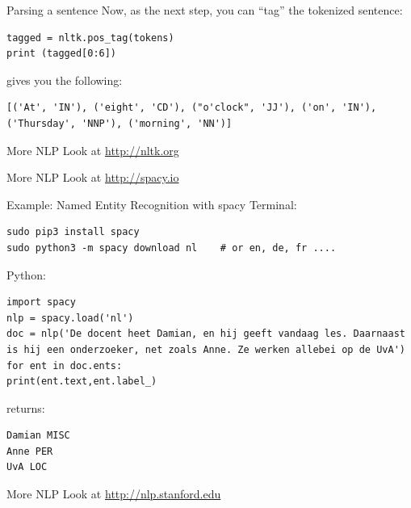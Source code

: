 \documentclass{beamer}
\begin{document}
\begin{frame}[fragile]{Parsing a sentence}
Now, as the next step, you can ``tag'' the tokenized sentence:
\begin{lstlisting}
tagged = nltk.pos_tag(tokens)
print (tagged[0:6])
\end{lstlisting}
gives you the following:
\begin{lstlisting}
[('At', 'IN'), ('eight', 'CD'), ("o'clock", 'JJ'), ('on', 'IN'),
('Thursday', 'NNP'), ('morning', 'NN')]
\end{lstlisting}


\end{frame}


\begin{frame}{More NLP}
\Huge{Look at \url{http://nltk.org}}

\end{frame}


\begin{frame}{More NLP}
\Huge{Look at \url{http://spacy.io}}
\end{frame}


\begin{frame}[fragile]{Example: Named Entity Recognition with spacy}
Terminal:

\begin{lstlisting}
sudo pip3 install spacy
sudo python3 -m spacy download nl    # or en, de, fr ....
\end{lstlisting}

Python:

\begin{lstlisting}
import spacy
nlp = spacy.load('nl')
doc = nlp('De docent heet Damian, en hij geeft vandaag les. Daarnaast is hij een onderzoeker, net zoals Anne. Ze werken allebei op de UvA')
for ent in doc.ents:
print(ent.text,ent.label_)
\end{lstlisting}

returns:

\begin{lstlisting}
Damian MISC
Anne PER
UvA LOC
\end{lstlisting}  

\end{frame}



\begin{frame}{More NLP}
\Huge{Look at \url{http://nlp.stanford.edu}}
\end{frame}
\end{document}
